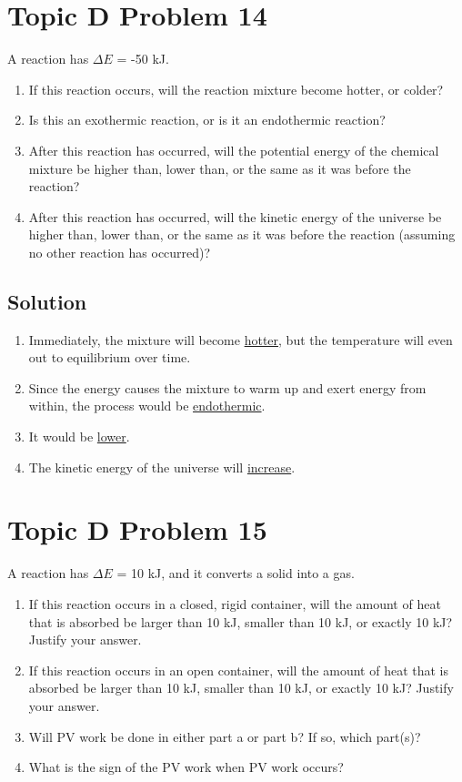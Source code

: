 \documentclass[10pt]{article}
\newcommand{\U}[1]{\underline{#1}}
\begin{document}
    \section{Topic D Problem 14}
        A reaction has $\Delta E$ = -50 kJ.
        \begin{enumerate}[label=\alph*)]
            \item   If this reaction occurs, will the reaction mixture become hotter, or colder?
            \item   Is this an exothermic reaction, or is it an endothermic reaction?
            \item   After this reaction has occurred, will the potential energy of the chemical mixture be higher than, lower than, or the same as it was before the reaction?
            \item   After this reaction has occurred, will the kinetic energy of the universe be higher than, lower than, or the same as it was before the reaction (assuming no other reaction has occurred)?
        \end{enumerate}
        
        \subsection{Solution}
            \begin{enumerate}[label=\alph*)]
                \item   Immediately, the mixture will become \U{hotter}, but the temperature will even out to equilibrium over time.
                \item   Since the energy causes the mixture to warm up and exert energy from within, the process would be \U{endothermic}.
                \item   It would be \U{lower}.
                \item   The kinetic energy of the universe will \U{increase}. 
            \end{enumerate}

    \pagebreak
    \section{Topic D Problem 15}
        A reaction has $\Delta E$ = 10 kJ, and it converts a solid into a gas.
        \begin{enumerate}[label=\alph*)]
            \item If this reaction occurs in a closed, rigid container, will the amount of heat that is absorbed be larger than 10 kJ, smaller than 10 kJ, or exactly 10 kJ? Justify your answer.
            \item If this reaction occurs in an open container, will the amount of heat that is absorbed be larger than 10 kJ, smaller than 10 kJ, or exactly 10 kJ? Justify your answer.
            \item Will PV work be done in either part a or part b? If so, which part(s)?
            \item What is the sign of the PV work when PV work occurs?
        \end{enumerate}
        
\end{document}
